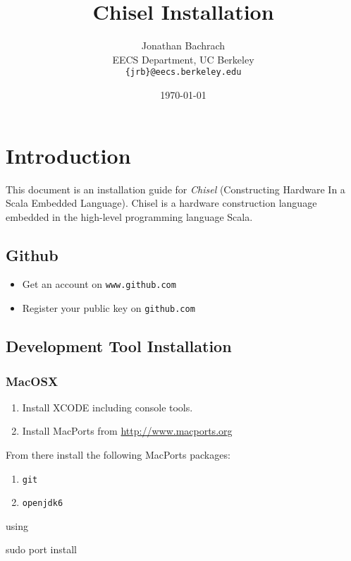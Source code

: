 \documentclass[twocolumn, 10pt]{article}
\title{Chisel Installation}
\author{Jonathan Bachrach \\
EECS Department, UC Berkeley\\
{\tt  \{jrb\}@eecs.berkeley.edu}
}
\date{\today}
\begin{document}
\maketitle{}

\section{Introduction}

This document is an installation guide for {\em Chisel} (Constructing
Hardware In a Scala Embedded Language).  Chisel is a hardware
construction language embedded in the high-level programming language
Scala.  

\subsection{Github}

\begin{itemize}
\item Get an account on \verb|www.github.com|
\item Register your public key on \verb|github.com|
\end{itemize}

\subsection{Development Tool Installation}

\subsubsection{MacOSX}

\begin{enumerate}
\item Install XCODE including console tools.
\item Install MacPorts from \url{http://www.macports.org}
\end{enumerate}

\noindent
From there install the following MacPorts packages:

\begin{enumerate}
\item \verb+git+
\item \verb+openjdk6+
\end{enumerate}

\noindent
using

\begin{bash}
sudo port install
\end{bash}
\end{document}
